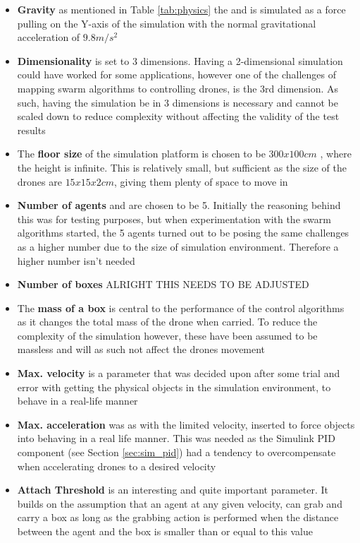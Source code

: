 \begin{itemize}
\item{\textbf{Gravity} as mentioned in Table \ref{tab:physics} the and is simulated as a force pulling on the Y-axis of the simulation with the normal gravitational acceleration of ${9.8m/s^2}$}	
\item{\textbf{Dimensionality} is set to 3 dimensions. Having a 2-dimensional simulation could have worked for some applications, however one of the challenges of mapping swarm algorithms to controlling drones, is the 3rd dimension. As such, having the simulation be in 3 dimensions is necessary and cannot be scaled down to reduce complexity without affecting the validity of the test results}	
\item{The \textbf{floor size} of the simulation platform is chosen to be ${300x100cm}$ , where the height is infinite. This is relatively small, but sufficient as the size of the drones are ${15x15x2cm}$, giving them plenty of space to move in}	
\item{\textbf{Number of agents} and are chosen to be 5. Initially the reasoning behind this was for testing purposes, but when experimentation with the swarm algorithms started, the 5 agents turned out to be posing the same challenges as a higher number due to the size of simulation environment. Therefore a higher number isn't needed}	
\item{\textbf{Number of boxes} ALRIGHT THIS NEEDS TO BE ADJUSTED} %
\item{The \textbf{mass of a box} is central to the performance of the control algorithms as it changes the total mass of the drone when carried. To reduce the complexity of the simulation however, these have been assumed to be massless and will as such not affect the drones movement}	
\item{\textbf{Max. velocity} is a parameter that was decided upon after some trial and error with getting the physical objects in the simulation environment, to behave in a real-life manner}	
\item{\textbf{Max. acceleration} was as with the limited velocity, inserted to force objects into behaving in a real life manner. This was needed as the Simulink PID component (see Section \ref{sec:sim_pid}) had a tendency to overcompensate when accelerating drones to a desired velocity}	
\item{\textbf{Attach Threshold} is an interesting and quite important parameter. It builds on the assumption that an agent at any given velocity, can grab and carry a box as long as the grabbing action is performed when the distance between the agent and the box is smaller than or equal to this value}	
\end{itemize}



